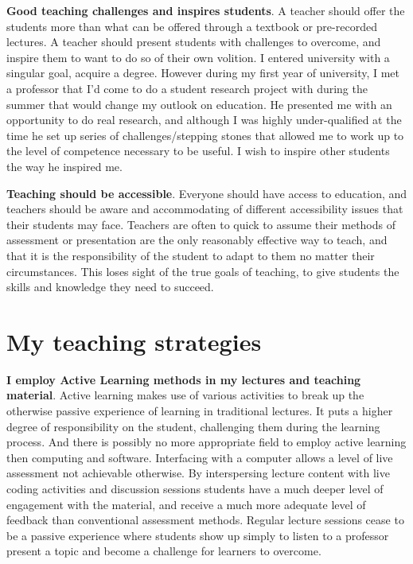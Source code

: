 \documentclass[12pt]{report}
\begin{document}
\noindent
\textbf{Good teaching challenges and inspires students}. A teacher should offer the
students more than what can be offered through a textbook or pre-recorded
lectures. A teacher should present students with challenges to overcome, and
inspire them to want to do so of their own volition. I entered university with
a singular goal, acquire a degree. However during my first year of university,
I met a professor that I'd come to do a student research project with during
the summer that would change my outlook on education. He presented me with an
opportunity to do real research, and although I was highly under-qualified at
the time he set up series of challenges/stepping stones that allowed me to
work up to the level of competence necessary to be useful. I wish to inspire
other students the way he inspired me.

\noindent
\textbf{Teaching should be accessible}. Everyone should have access to education, and
teachers should be aware and accommodating of different accessibility issues
that their students may face. Teachers are often to quick to assume their
methods of assessment or presentation are the only reasonably effective way to
teach, and that it is the responsibility of the student to adapt to them no matter
their circumstances. This loses sight of the true goals of teaching, to give
students the skills and knowledge they need to succeed.

\section{My teaching strategies}
\label{sec:orgaa64c71}

\textbf{I employ Active Learning methods in my lectures and teaching material}.
Active learning makes use of various activities to break up the otherwise
passive experience of learning in traditional lectures. It puts a higher
degree of responsibility on the student, challenging them during the learning
process. And there is possibly no more appropriate field to employ active
learning then computing and software. Interfacing with a computer allows a
level of live assessment not achievable otherwise. By interspersing lecture
content with live coding activities and discussion sessions students have a
much deeper level of engagement with the material, and receive a much more
adequate level of feedback than conventional assessment methods. Regular
lecture sessions cease to be a passive experience where students show up
simply to listen to a professor present a topic and become a challenge for
learners to overcome.
\end{document}
